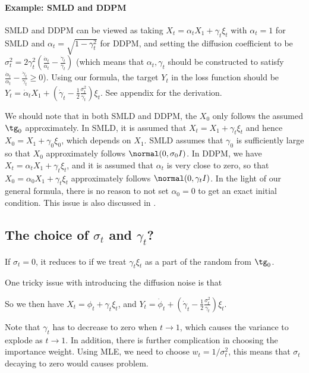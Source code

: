  
\paragraph{Example: SMLD and DDPM}
SMLD and DDPM can be viewed as taking $X_t = \alpha_t X_1 + \gamma_t \xi_t$ with $\alpha_t = 1$ for SMLD and $\alpha_t = \sqrt{1-\gamma_t^2}$ for DDPM, and setting the diffusion coefficient to be  $ {\sigma_t^2} = 2\gamma_t^2  (\frac{\dot\alpha_t}{\alpha_t} -\frac{\dot \gamma_t}{\gamma_t})$ (which means that $\alpha_t,\gamma_t$ should be constructed to satisfy  $\frac{\dot\alpha_t}{\alpha_t} -\frac{\dot \gamma_t}{\gamma_t}\geq 0$). 
Using our formula, the target $Y_t$ in the loss function should be 
$Y_t = \dot \alpha_t X_1 + \left (\dot \gamma_t - \frac{1}{2} \frac{\sigma_t^2}{\gamma_t}\right)  \xi_t.$ 
See appendix for the derivation. 

We should note that in both SMLD and DDPM, 
the $X_0$ only follows the assumed $\tg_0$ approximately.  
In SMLD, it is assumed that $X_t = X_1 + \gamma_t \xi_t$ and hence $X_0 = X_1 + \gamma_0 \xi_0$, which depends on $X_1$. SMLD assumes that $\gamma_0$ is sufficiently large so that $X_0$ approximately follows $\normal(0, \sigma_0I)$. 
In DDPM, we have $X_t =\alpha_t X_1 + \gamma_t \xi_t$, and it is assumed that $\alpha_t$ is very close to zero, so that $X_0 = \alpha_0 X_1 + \gamma_t \xi_t$ approximately follows $\normal(0, \gamma_t I)$. In the light of  our general formula, there is no reason to not set $\alpha_0=0$ to get an exact initial condition. This issue is also discussed in . 

 \subsection{The choice of $\sigma_t$ and $\gamma_t$?}
 
 If $\sigma_t=0$, it reduces to  
 if we treat $\gamma_t \xi_t$ as a part of the random from $\tg_0$.
 
 One tricky issue with introducing the diffusion 
 noise is that 

So we then have $X_t = \phi_t + \gamma_t \xi_t$, and $Y_t = \dot \phi_t + (\dot \gamma_t - \frac{1}{2}\frac{\sigma_t^2}{\gamma_t} ) \xi_t$. 

Note that $\gamma_t$ has to decrease to zero when $t\to 1$, which causes the variance to explode as $t\to 1$. In addition, there is further complication  in choosing the importance weight. Using MLE, we need to choose $w_t = 1/\sigma_t^2$, this means that $\sigma_t$ decaying to zero would causes problem.  


